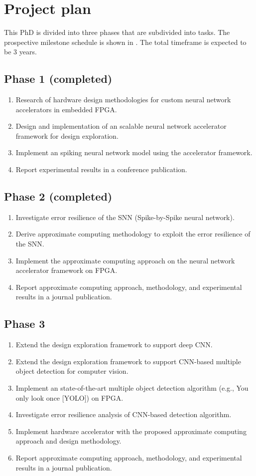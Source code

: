\section{Project plan}
This PhD is divided into three phases that are subdivided into tasks. The prospective milestone schedule is shown in . The total timeframe is expected to be 3 years.

\subsection{Phase 1 (completed)}
\begin{enumerate}
\item Research of hardware design methodologies for custom neural network accelerators in embedded FPGA.
\item Design and implementation of an scalable neural network accelerator framework for design exploration.
\item Implement an spiking neural network model using the accelerator framework.
\item Report experimental results in a conference publication.
\end{enumerate}

\subsection{Phase 2 (completed)}
\begin{enumerate}
	\item Investigate error resilience of the SNN (Spike-by-Spike neural network).
	\item Derive approximate computing methodology to exploit the error resilience of the SNN.
	\item Implement the approximate computing approach on the neural network accelerator framework on FPGA.
	\item Report approximate computing approach, methodology, and experimental results in a journal publication.
\end{enumerate}

\subsection{Phase 3}
\begin{enumerate}
	\item Extend the design exploration framework to support deep CNN.
	\item Extend the design exploration framework to support CNN-based multiple object detection for computer vision.
	\item Implement an state-of-the-art multiple object detection algorithm (e.g., You only look once [YOLO]) on FPGA.
	\item Investigate error resilience analysis of CNN-based detection algorithm.
	\item Implement hardware accelerator with the proposed approximate computing approach and design methodology.
	\item Report approximate computing approach, methodology, and experimental results in a journal publication.
\end{enumerate}

